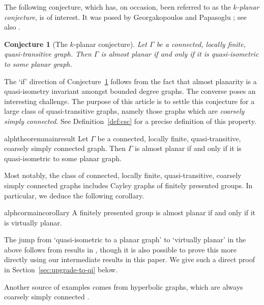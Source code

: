 \documentclass[11pt,a4paper]{amsart}
\newtheorem{conjecture}[theorem]{Conjecture}
\theoremstyle{definition}
\begin{document}
The following conjecture, which has, on occasion, been referred to as the \emph{$k$-planar conjecture}, is of interest. It was posed by Georgakopoulos and Papasoglu {\cite[Prob.~9.4]{georgakopoulos2025graph}}; see also \cite[Conj.~6.1]{Esperet_Giocanti_2024}.

\begin{conjecture}[The $k$-planar conjecture]\label{conj:k-planar-conjecture}
    Let $\Gamma$ be a connected, locally finite, quasi-transitive
    graph. Then $\Gamma$ is almost planar if and only if it is quasi-isometric to some planar graph. 
\end{conjecture}


The `if' direction of Conjecture~\ref{conj:k-planar-conjecture} follows from the fact that almost planarity is a quasi-isometry invariant amongst bounded degree graphs. The converse poses an interesting challenge. 
% 
% 
The purpose of this article is to settle this conjecture for a large class of quasi-transitive graphs, namely those graphs which are \emph{coarsely simply connected}. See Definition~\ref{def:csc} for a precise definition of this property.

\begin{restatable}{alphtheorem}{mainresult}\label{thm:main-result}
Let $\Gamma$ be a connected, locally finite, quasi-transitive, coarsely simply connected 
    graph. Then $\Gamma$ is almost planar if and only if it is quasi-isometric to some planar graph. 
\end{restatable}

Most notably, the class of  connected, locally finite, quasi-transitive, coarsely simply connected 
    graphs includes Cayley graphs of finitely presented groups. In particular, we deduce the following corollary.

\begin{restatable}{alphcor}{maincorollary}\label{cor:intro-fpgroups}
    A finitely presented group is almost planar if and only if it is virtually planar.
\end{restatable}

The jump from `quasi-isometric to a planar graph' to `virtually planar' in the above follows from results in \cite{macmanus2023accessibility}, though it is also possible to prove this more directly using our intermediate results in this paper. We give such a direct proof in Section~\ref{sec:upgrade-to-qi} below.

Another source of examples comes from hyperbolic graphs, which are always coarsely simply connected \cite[{Prop.~$\Gamma$.3.23}]{bridson2013metric}.
\end{document}
